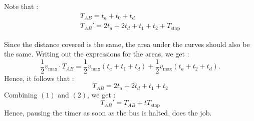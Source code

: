 Note that : 
\begin{gather*}
    T_{AB}= t_{a}+t_0 + t_d \\
    T_{AB}' = 2t_{a}+2t_d + t_1+t_2 + T_{\operatorname{stop}} \tag{1}
\end{gather*}

\noindent Since the distance covered is the same, the area under the curves should also be the same. Writing out the expressions for the areas, we get : 
\[\frac12 v_{\max}\cdot T_{AB} = \frac12 v_{\max} (t_a + t_1 + t_d) + \frac12 v_{\max} (t_a+t_2+t_d).\]
Hence, it follows that : 
\[T_{AB} = 2t_a + 2t_d + t_1 + t_2\tag{2}\]
Combining $(1)$ and $(2)$, we get :
\[T_{AB}' = T_{AB} + tT_{\operatorname{stop}}\]
Hence, pausing the timer as soon as the bus is halted, does the job.
